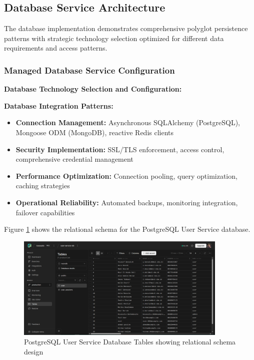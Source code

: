 \subsection{Database Service Architecture}

The database implementation demonstrates comprehensive polyglot persistence patterns with strategic technology selection optimized for different data requirements and access patterns.

\subsubsection{Managed Database Service Configuration}

\textbf{Database Technology Selection and Configuration:}



\textbf{Database Integration Patterns:}
\begin{itemize}
\item \textbf{Connection Management:} Asynchronous SQLAlchemy (PostgreSQL), Mongoose ODM (MongoDB), reactive Redis clients
\item \textbf{Security Implementation:} SSL/TLS enforcement, access control, comprehensive credential management
\item \textbf{Performance Optimization:} Connection pooling, query optimization, caching strategies
\item \textbf{Operational Reliability:} Automated backups, monitoring integration, failover capabilities
\end{itemize}

Figure \ref{fig:postgresql-user-tables} shows the relational schema for the PostgreSQL User Service database.

\begin{figure}[H]
\centering
\includegraphics[width=0.9\textwidth]{figures/chapter5/postgresql-database-user-tables.png}
\caption{PostgreSQL User Service Database Tables showing relational schema design}
\label{fig:postgresql-user-tables}
\end{figure}


